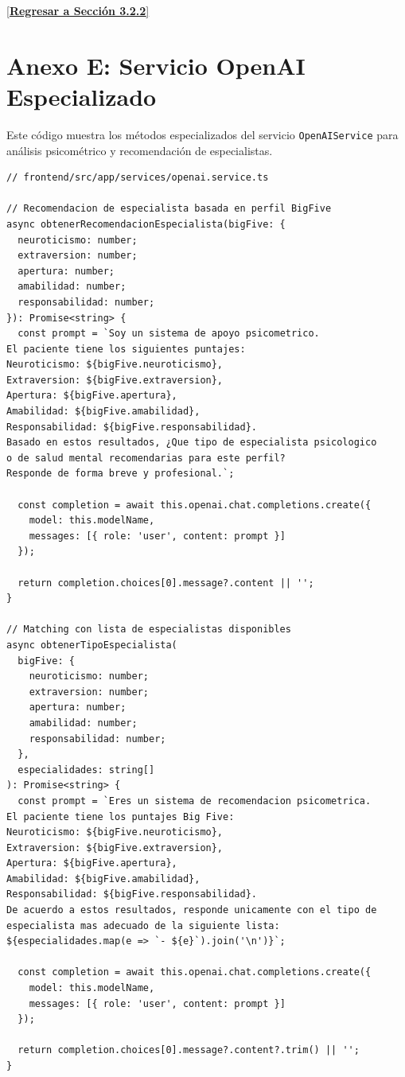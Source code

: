 \documentclass[12pt,a4paper]{report}
\numberwithin{figure}{section}
\begin{document}
\vspace{1em}
\begin{center}
\hyperref[lst:sendmessage-ref]{[\textbf{Regresar a Sección 3.2.2}]}
\end{center}

\newpage

\section*{Anexo E: Servicio OpenAI Especializado}
\label{anexo:openai-service}

\noindent Este código muestra los métodos especializados del servicio \texttt{OpenAIService} para análisis psicométrico y recomendación de especialistas.

\begin{lstlisting}[style=angelcode,caption={Métodos especializados de OpenAIService - Código completo}]
// frontend/src/app/services/openai.service.ts

// Recomendacion de especialista basada en perfil BigFive
async obtenerRecomendacionEspecialista(bigFive: {
  neuroticismo: number;
  extraversion: number;
  apertura: number;
  amabilidad: number;
  responsabilidad: number;
}): Promise<string> {
  const prompt = `Soy un sistema de apoyo psicometrico.
El paciente tiene los siguientes puntajes:
Neuroticismo: ${bigFive.neuroticismo},
Extraversion: ${bigFive.extraversion},
Apertura: ${bigFive.apertura},
Amabilidad: ${bigFive.amabilidad},
Responsabilidad: ${bigFive.responsabilidad}.
Basado en estos resultados, ¿Que tipo de especialista psicologico 
o de salud mental recomendarias para este perfil? 
Responde de forma breve y profesional.`;

  const completion = await this.openai.chat.completions.create({
    model: this.modelName,
    messages: [{ role: 'user', content: prompt }]
  });
  
  return completion.choices[0].message?.content || '';
}

// Matching con lista de especialistas disponibles
async obtenerTipoEspecialista(
  bigFive: {
    neuroticismo: number;
    extraversion: number;
    apertura: number;
    amabilidad: number;
    responsabilidad: number;
  }, 
  especialidades: string[]
): Promise<string> {
  const prompt = `Eres un sistema de recomendacion psicometrica.
El paciente tiene los puntajes Big Five:
Neuroticismo: ${bigFive.neuroticismo},
Extraversion: ${bigFive.extraversion},
Apertura: ${bigFive.apertura},
Amabilidad: ${bigFive.amabilidad},
Responsabilidad: ${bigFive.responsabilidad}.
De acuerdo a estos resultados, responde unicamente con el tipo de 
especialista mas adecuado de la siguiente lista:
${especialidades.map(e => `- ${e}`).join('\n')}`;

  const completion = await this.openai.chat.completions.create({
    model: this.modelName,
    messages: [{ role: 'user', content: prompt }]
  });
  
  return completion.choices[0].message?.content?.trim() || '';
}
\end{lstlisting}
\end{document}

